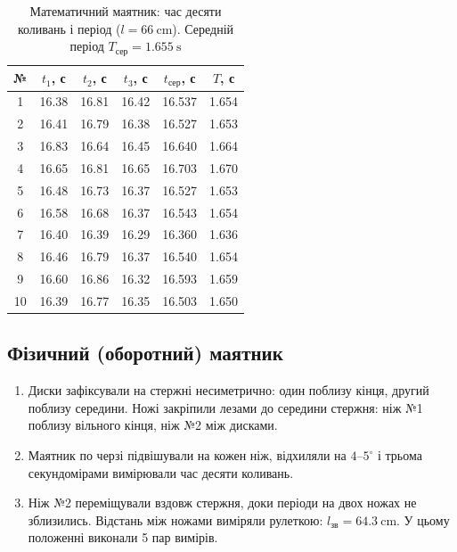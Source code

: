 \documentclass[ukrainian]{ucaphyslab}
\begin{document}
\begin{table}[H]
  \centering
  \begin{tabular}{@{}c ccc cc@{}}
    \toprule
    № & \(t_1\), с & \(t_2\), с & \(t_3\), с & \(t_\text{сер}\), с & \(T\), с \\
    \midrule
    1  & 16.38 & 16.81 & 16.42 & 16.537 & 1.654 \\
    2  & 16.41 & 16.79 & 16.38 & 16.527 & 1.653 \\
    3  & 16.83 & 16.64 & 16.45 & 16.640 & 1.664 \\
    4  & 16.65 & 16.81 & 16.65 & 16.703 & 1.670 \\
    5  & 16.48 & 16.73 & 16.37 & 16.527 & 1.653 \\
    6  & 16.58 & 16.68 & 16.37 & 16.543 & 1.654 \\
    7  & 16.40 & 16.39 & 16.29 & 16.360 & 1.636 \\
    8  & 16.46 & 16.79 & 16.37 & 16.540 & 1.654 \\
    9  & 16.60 & 16.86 & 16.32 & 16.593 & 1.659 \\
    10 & 16.39 & 16.77 & 16.35 & 16.503 & 1.650 \\
    \bottomrule
  \end{tabular}
  \caption{Математичний маятник: час десяти коливань і період (\(l = \SI{66}{\centi\meter}\)). Середній період \(T_\text{сер} = \SI{1.655}{\second}\)}
  \label{tab:math}
\end{table}

\subsection{Фізичний (оборотний) маятник}
\begin{enumerate}
  \item Диски зафіксували на стержні несиметрично: один поблизу кінця, другий поблизу середини. Ножі закріпили лезами до середини стержня: ніж №1 поблизу вільного кінця, ніж №2 між дисками.
  \item Маятник по черзі підвішували на кожен ніж, відхиляли на \(4\)--\(5^{\circ}\) і трьома секундомірами вимірювали час десяти коливань.
  \item Ніж №2 переміщували вздовж стержня, доки періоди на двох ножах не зблизились. Відстань між ножами виміряли рулеткою: \(l_{\text{зв}} = \SI{64.3}{\centi\meter}\). У цьому положенні виконали 5 пар вимірів.
\end{enumerate}
\end{document}
